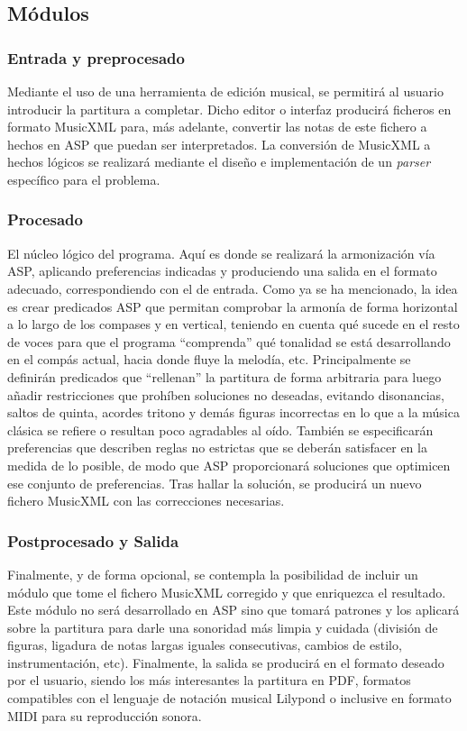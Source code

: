 \subsection{Módulos}

\subsubsection{Entrada y preprocesado}
Mediante el uso de una herramienta de edición musical, se permitirá al usuario introducir la partitura a completar. Dicho editor o interfaz producirá ficheros en formato MusicXML para, más adelante, convertir las notas de este fichero a hechos en ASP que puedan ser interpretados. La conversión de MusicXML a hechos lógicos se realizará mediante el diseño e implementación de un \textit{parser} específico para el problema.

\subsubsection{Procesado}
El núcleo lógico del programa. Aquí es donde se realizará la armonización vía ASP, aplicando preferencias indicadas y produciendo una salida en el formato adecuado, correspondiendo con el de entrada. Como ya se ha mencionado, la idea es crear predicados ASP que permitan comprobar la armonía de forma horizontal a lo largo de los compases y en vertical, teniendo en cuenta qué sucede en el resto de voces para que el programa “comprenda” qué tonalidad se está desarrollando en el compás actual, hacia donde fluye la melodía, etc. Principalmente se definirán predicados que “rellenan” la partitura de forma arbitraria para luego añadir restricciones que prohíben soluciones no deseadas, evitando disonancias, saltos de quinta, acordes tritono y demás figuras incorrectas en lo que a la música clásica se refiere o resultan poco agradables al oído. También se especificarán preferencias que describen reglas no estrictas que se deberán satisfacer en la medida de lo posible, de modo que ASP proporcionará soluciones que optimicen ese conjunto de preferencias. Tras hallar la solución, se producirá un nuevo fichero MusicXML con las correcciones necesarias. 

\subsubsection{Postprocesado y Salida}
Finalmente, y de forma opcional, se contempla la posibilidad de incluir un módulo que tome el fichero MusicXML corregido y que enriquezca el resultado. Este módulo no será desarrollado en ASP sino que tomará patrones y los aplicará sobre la partitura para darle una sonoridad más limpia y cuidada (división de figuras, ligadura de notas largas iguales consecutivas, cambios de estilo, instrumentación, etc). Finalmente, la salida se producirá en el formato deseado por el usuario, siendo los más interesantes la partitura en PDF, formatos compatibles con el lenguaje de notación musical Lilypond o inclusive en formato MIDI para su reproducción sonora. 

